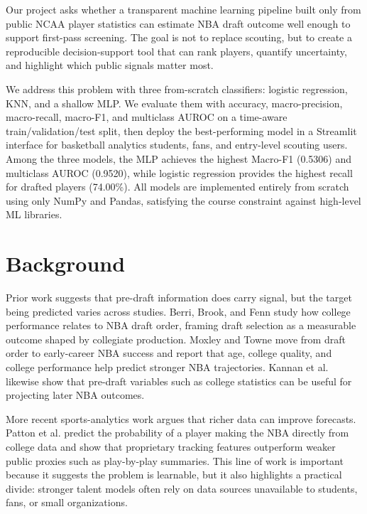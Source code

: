 Our project asks whether a transparent machine learning pipeline built only from public NCAA player statistics can estimate NBA draft outcome well enough to support first-pass screening. The goal is not to replace scouting, but to create a reproducible decision-support tool that can rank players, quantify uncertainty, and highlight which public signals matter most.

We address this problem with three from-scratch classifiers: logistic regression, KNN, and a shallow MLP. We evaluate them with accuracy, macro-precision, macro-recall, macro-F1, and multiclass AUROC on a time-aware train/validation/test split, then deploy the best-performing model in a Streamlit interface for basketball analytics students, fans, and entry-level scouting users. Among the three models, the MLP achieves the highest Macro-F1 (0.5306) and multiclass AUROC (0.9520), while logistic regression provides the highest recall for drafted players (74.00\%). All models are implemented entirely from scratch using only NumPy and Pandas, satisfying the course constraint against high-level ML libraries.

\section{Background}

Prior work suggests that pre-draft information does carry signal, but the target being predicted varies across studies. Berri, Brook, and Fenn \cite{berri2011nba} study how college performance relates to NBA draft order, framing draft selection as a measurable outcome shaped by collegiate production. Moxley and Towne \cite{moxley2015nba} move from draft order to early-career NBA success and report that age, college quality, and college performance help predict stronger NBA trajectories. Kannan et al. \cite{kannan2018nba} likewise show that pre-draft variables such as college statistics can be useful for projecting later NBA outcomes.

More recent sports-analytics work argues that richer data can improve forecasts. Patton et al. \cite{patton2021nba} predict the probability of a player making the NBA directly from college data and show that proprietary tracking features outperform weaker public proxies such as play-by-play summaries. This line of work is important because it suggests the problem is learnable, but it also highlights a practical divide: stronger talent models often rely on data sources unavailable to students, fans, or small organizations.

